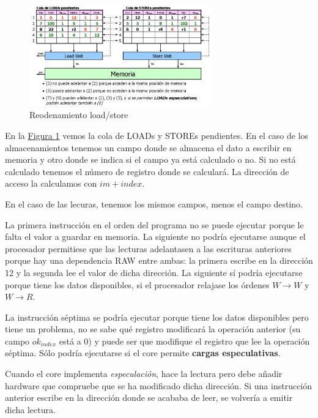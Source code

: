 \documentclass[10pt,a4paper,spanish]{report}
\begin{document}
\begin{figure}[!h]
\centering
\includegraphics[width=0.7\textwidth]{99}
\caption{Reodenamiento load/store}
\label{reordenamiento_loadstore}
\end{figure}

En la \hyperref[reordenamiento_loadstore]{Figura \ref*{reordenamiento_loadstore}} vemos la cola de LOADs y STOREs pendientes. En el caso de los almacenamientos tenemos un campo donde se almacena el dato a escribir en memoria y otro donde se indica si el campo ya está calculado o no. Si no está calculado tenemos el número de registro donde se calculará. La dirección de acceso la calculamos con $im+index$. 

En el caso de las lecuras, tenemos los mismos campos, menos el campo destino.

La primera instrucción en el orden del programa no se puede ejecutar porque le falta el valor a guardar en memoria. La siguiente no podría ejecutarse aunque el procesador permitiese que las lecturas adelantasen a las escrituras anteriores porque hay una dependencia RAW entre ambas: la primera escribe en la dirección 12 y la segunda lee el valor de dicha dirección. La siguiente sí podría ejecutarse porque tiene los datos disponibles, si el procesador relajase los órdenes $W \rightarrow W$ y $W \rightarrow R$. 

La instrucción séptima se podría ejecutar porque tiene los datos disponibles pero tiene un problema, no se sabe qué registro modificará la operación anterior (su campo $ok_{index}$ está a 0) y puede ser que modifique el registro que lee la operación séptima. Sólo podría ejecutarse si el core permite \textbf{\textcolor{azul}{cargas especulativas}}. 

Cuando el core implementa \textit{\textcolor{azul}{especulación}}, hace la lectura pero debe añadir hardware que compruebe que se ha modificado dicha dirección. Si una instrucción anterior escribe en la dirección donde se acababa de leer, se volvería a emitir dicha lectura.
\end{document}
